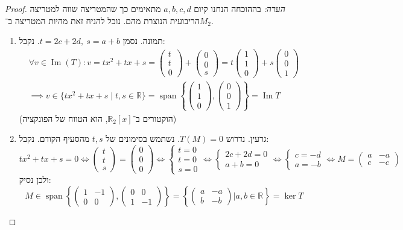\documentclass[]{article}
\newcommand\R     {\mathbb{R}}
\DeclareMathOperator\Img   {Im}
\DeclareMathOperator{\Sp}     {span}
\newcommand\co        {\colon}
\newcommand\pms[1]    {\begin{pmatrix}
		#1
\end{pmatrix}}
\newcommand\ccb[1]    {\left \{ #1 \right \}}
\newcommand\dequad    {\!\!\!\!\!\!}
\begin{document}
\begin{proof}
		\textit{הערה: }בההוכחה הנחנו קיום $a, b, c, d$ מתאימים כך שהמטריצה שווה למטריצה הריבועית הנוצרת מהם. נוכל להניח זאת מהיות המטריצה ב־$M_2$.
		\begin{enumerate}
			\item תמונה. נסמן $t = 2c + 2d, \ s = a + b$. נקבל: 
			\begin{gather*}
				\forall v \in \Img(T)\co v = tx^2 + tx + s = \pms{t \\ t \\ 0} + \pms{0 \\ 0 \\ s} = t \pms{1 \\ 1 \\ 0} + s \pms{0 \\ 0 \\ 1} \\
				\implies v \in \{tx^2 + tx + s \mid t, s \in \R\} = \Sp\ccb{\pms{1 \\ 1 \\ 0}, \pms{0 \\ 0 \\ 1}} = \Img T
			\end{gather*}
			(הוקטורים ב־$\R_2[x]$, הוא הטווח של הפונקציה)
			\item גרעין. נדרוש  $T(M) = 0$. נשתמש בסימונים של $t, s$ מהסעיף הקודם. נקבל: 
			\[ tx^2 + tx + s = 0 \iff \pms{t \\ t \\ s} = \pms{0 \\ 0 \\ 0} \iff \begin{cases}
				t = 0 \\ t = 0 \\ s = 0
			\end{cases} \dequad\iff \begin{cases}
				2c + 2d = 0 \\
				a + b = 0
			\end{cases} \dequad\iff \begin{cases}
				c = -d \\ a = -b
			\end{cases} \dequad\iff M = \pms{a & -a \\ c & -c}
			 \]
			 ולכן נסיק: 
			 \[ M \in \Sp\ccb{\pms{1 & -1 \\ 0 & 0}, \pms{0 & 0 \\ 1 & -1}} = \ccb{\pms{a & -a \\ b & -b} \big\vert a, b \in \R} = \ker T \]
		\end{enumerate}
	\end{proof}
	
\end{document}

